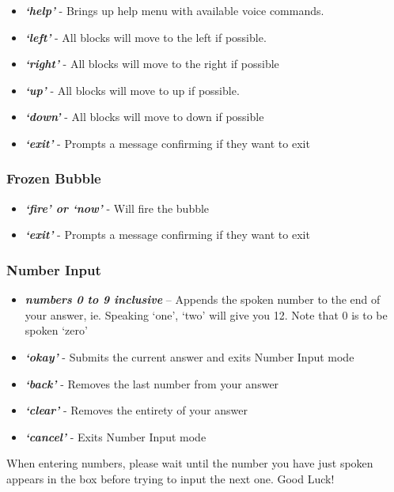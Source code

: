 \documentclass[11pt, oneside]{article}
\begin{document}
\begin{itemize}
  	\item {\em\bf`help'} - Brings up help menu with available voice commands. 

	\item {\em\bf`left'} - All blocks will move to the left if possible. 
	\item {\em\bf`right'} - All blocks will move to the right if possible
	\item {\em\bf`up'} - All blocks will move to up if possible. 
	\item {\em\bf`down'} - All blocks will move to down if possible
	\item {\em\bf`exit'} - Prompts a message confirming if they want to exit
	
\end{itemize}

\subsubsection{Frozen Bubble}

\begin{itemize}
	\item {\em\bf`fire' or `now'} - Will fire the bubble
	\item {\em\bf`exit'} - Prompts a message confirming if they want to exit
	
\end{itemize}

\pagebreak

\subsubsection{Number Input}
\begin{itemize}
  \item {\em\bf numbers 0 to 9 inclusive} – Appends the spoken number
    to the end of your answer, ie. Speaking `one', `two' will give you
    12. Note that 0 is to be spoken `zero'
  \item {\em\bf `okay'} - Submits the current answer and exits Number
    Input mode
  \item {\em\bf `back'} - Removes the last number from your answer
  \item {\em\bf `clear'} - Removes the entirety of your answer
  \item {\em\bf `cancel'} - Exits Number Input mode
\end{itemize}

When entering numbers, please wait until the number you have just spoken appears
in the box before trying to input the next one.
Good Luck!
\end{document}
